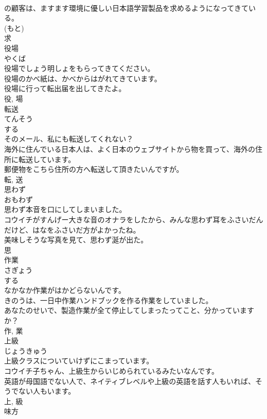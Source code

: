 \documentclass[8pt]{extreport}
\begin{document}
\begin{CJK}{UTF8}{min}
\\	の顧客は、ますます環境に優しい日本語学習製品を求めるようになってきている。	
\\	(もと) 
\\	求	
\\	役場	
\\	やくば	
\\	役場でしょう明しょをもらってきてください。	
\\	役場のかべ紙は、かべからはがれてきています。	
\\	役場に行って転出届を出してきたよ。	
\\	役, 場	
\\	転送	
\\	てんそう	
\\	する 
\\	そのメール、私にも転送してくれない？	
\\	海外に住んでいる日本人は、よく日本のウェブサイトから物を買って、海外の住所に転送しています。	
\\	郵便物をこちら住所の方へ転送して頂きたいんですが。	
\\	転, 送	
\\	思わず	
\\	おもわず	
\\	思わず本音を口にしてしまいました。	
\\	コウイチがすんげー大きな音のオナラをしたから、みんな思わず耳をふさいだんだけど、はなをふさいだ方がよかったね。	
\\	美味しそうな写真を見て、思わず涎が出た。	
\\	思	
\\	作業	
\\	さぎょう	
\\	する 
\\	なかなか作業がはかどらないんです。	
\\	きのうは、一日中作業ハンドブックを作る作業をしていました。	
\\	あなたのせいで、製造作業が全て停止してしまったってこと、分かっていますか？	
\\	作, 業	
\\	上級	
\\	じょうきゅう	
\\	上級クラスについていけずにこまっています。	
\\	コウイチ子ちゃん、上級生からいじめられているみたいなんです。	
\\	英語が母国語でない人で、ネイティブレベルや上級の英語を話す人もいれば、そうでない人もいます。	
\\	上, 級	
\\	味方	

\end{CJK}
\end{document}
